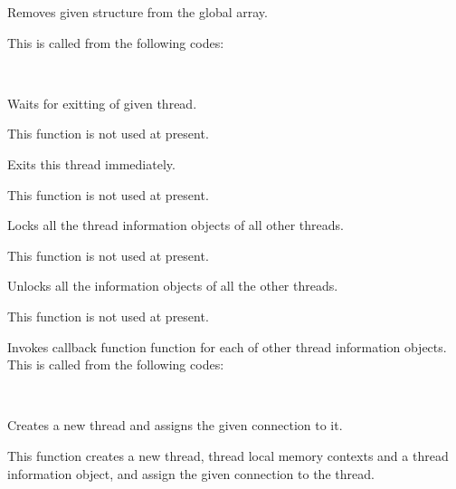   
    Removes given  structure from the global array.
    
    This is called from the following codes:
    
    \FuncRefHdr
		\\ \hline
    \FuncRefTrailor
  
  
    Waits for exitting of given thread.
    
    This function is not used at present.
  
  
    Exits this thread immediately.
    
    This function is not used at present.
  
  
    Locks all the thread information objects of all other threads.
    
    This function is not used at present.
  
  
    Unlocks all the information objects of all the other threads.
    
    This function is not used at present.
  
  
    Invokes callback function function for each of other thread information objects.
    This is called from the following codes:
    
    \FuncRefHdr
		\\ \hline
    \FuncRefTrailor
  
  
    Creates a new thread and assigns the given connection to it.
    
    This function creates a new thread, thread local memory contexts and a thread information object, and assign the given connection to the thread.
    
